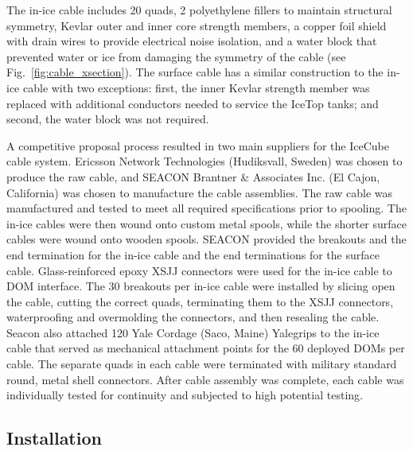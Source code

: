 The in-ice cable includes 20 quads, 2 polyethylene fillers to maintain structural
symmetry, Kevlar outer and inner core strength members, a copper foil
shield with drain wires to provide electrical noise isolation, and a water
block that prevented water or ice from damaging the symmetry of the
cable (see Fig.~\ref{fig:cable_xsection}). The surface cable has a similar
construction to the in-ice 
cable with two exceptions: first, the inner Kevlar strength member was replaced
with additional conductors needed to service the IceTop tanks; and second, the
water block was not required.

A competitive proposal process resulted in two main suppliers for the IceCube
cable system.  Ericsson Network Technologies (Hudiksvall, Sweden) was chosen
to produce the raw cable, and SEACON Brantner \& Associates Inc. (El Cajon,
California) was chosen to manufacture the cable assemblies. The raw
cable was manufactured and tested to meet all required specifications prior to spooling.  The in-ice cables were then
wound onto custom metal spools, while the shorter surface cables were wound
onto wooden spools. SEACON provided the breakouts
and the end termination for the in-ice cable and the end
terminations for the surface cable.  Glass-reinforced epoxy XSJJ
connectors were used for the in-ice
cable to DOM interface. The 30 breakouts per in-ice cable were installed by
slicing open the cable, cutting the correct quads, terminating them to the
XSJJ connectors, waterproofing and overmolding the connectors, and then
resealing the cable. Seacon also
attached 120 Yale Cordage (Saco, Maine) Yalegrips to the in-ice
cable that served as mechanical attachment points for the 60 deployed DOMs
per cable. The separate quads in each cable were terminated with
military standard round,
metal shell connectors. After cable assembly was complete, 
each cable was individually tested for continuity and subjected to high
potential testing. 

\subsection{Installation}

